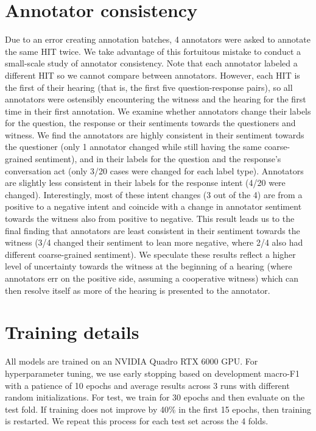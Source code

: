 \section{Annotator consistency}
\label{sec:app_consistency}
Due to an error creating annotation batches, 4 annotators were asked to annotate the same HIT twice. We take advantage of this fortuitous mistake to conduct a small-scale study of annotator consistency. Note that each annotator labeled a different HIT so we cannot compare between annotators. However, each HIT is the first of their hearing (that is, the first five question-response pairs), so all annotators were ostensibly encountering the witness and the hearing for the first time in their first annotation. We examine whether annotators change their labels for the question, the response or their sentiments towards the questioners and witness. We find the annotators are highly consistent in their sentiment towards the questioner (only 1 annotator changed while still having the same coarse-grained sentiment), and in their labels for the question and the response's conversation act (only 3/20 cases were changed for each label type). Annotators are slightly less consistent in their labels for the response intent (4/20 were changed). Interestingly, most of these intent changes (3 out of the 4) are from a positive to a negative intent and coincide with a change in annotator sentiment towards the witness also from positive to negative. This result leads us to the final finding that annotators are least consistent in their sentiment towards the witness (3/4 changed their sentiment to lean more negative, where 2/4 also had different coarse-grained sentiment). We speculate these results reflect a higher level of uncertainty towards the witness at the beginning of a hearing (where annotators err on the positive side, assuming a cooperative witness) which can then resolve itself as more of the hearing is presented to the annotator. 

\section{Training details}
\label{sec:app_training}

All models are trained on an NVIDIA Quadro RTX 6000 GPU. For hyperparameter tuning, we use early stopping based on development macro-F1 with a patience of 10 epochs and average results across 3 runs with different random initializations. For test, we train for 30 epochs and then evaluate on the test fold. If training does not improve by 40\% in the first 15 epochs, then training is restarted. We repeat this process for each test set across the 4 folds.

